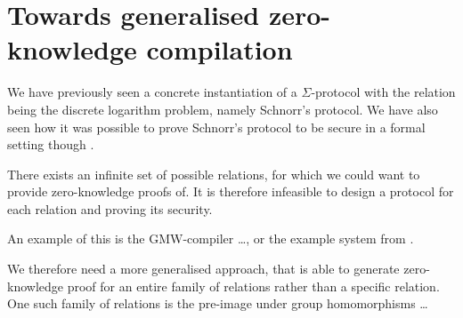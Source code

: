 \chapter{Towards generalised zero-knowledge compilation}
\label{ch:general_zk}
We have previously seen a concrete instantiation of a $\Sigma$-protocol with the
relation being the discrete logarithm problem, namely Schnorr's protocol. We
have also seen how it was possible to prove Schnorr's protocol to be secure in a
formal setting though \easycrypt.

There exists an infinite set of possible relations, for which we could want to
provide zero-knowledge proofs of. It is therefore infeasible to design a
protocol for each relation and proving its security.

An example of this is the GMW-compiler \dots, or the example system from \cite{zkcrypt}.

We therefore need a more generalised approach, that is able to generate
zero-knowledge proof for an entire family of relations rather than a specific relation.
One such family of relations is the pre-image under group homomorphisms \dots


